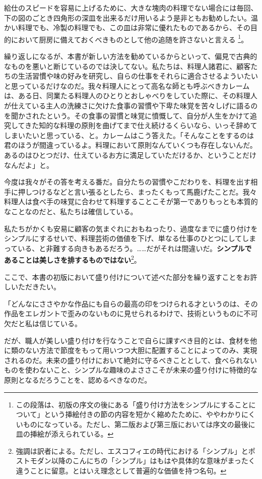 \begin{main}
給仕のスピードを容易に上げるために、大きな塊肉の料理でない場合には毎回、下の図のごとき四角形の深皿を出来るだけ用いるよう是非ともお勧めしたい。温かい料理でも、冷製の料理でも、この皿は非常に優れたものであるから、その目的において厨房に備えておくべきものとして他の追随を許さないと言える
\footnote{この段落は、初版の序文の後にある「盛り付け方法をシンプルにすることについて」という挿絵付きの節の内容を短かく縮めたために、ややわかりにくいものになっている。ただし、第二版および第三版においては序文の最後に皿の挿絵が添えられている。}。

繰り返しになるが、本書が新しい方法を勧めているからといって、偏見で古典的なものを悪いと断じているのでは決してない。私たちは、料理人諸君に、顧客たちの生活習慣や味の好みを研究し、自らの仕事をそれらに適合させるよういたいと思っているだけなのだ。我々料理人にとって高名な師とも呼ぶべきカレームは、ある日、同業たる料理人のひとりとおしゃべりをしていた際に、その料理人が仕えている主人の洗練さに欠けた食事の習慣や下卑た味覚を苦々しげに語るのを聞かされたという。その食事の習慣と味覚に憤慨して、自分が人生をかけて追究してきた知的な料理の原則を曲げてまで仕え続けるくらいなら、いっそ辞めてしまいたいと思っている、と。カレームはこう答えた。「そんなことをするのは君のほうが間違っているよ。料理において原則なんていくつも存在しないんだ。あるのはひとつだけ、仕えているお方に満足していただけるか、ということだけなんだよ」と。

今度は我々がその答を考える番だ。自分たちの習慣やこだわりを、料理を出す相手に押しつけるなどと言い張るとしたら、まったくもって馬鹿げたことだ。我々料理人は食べ手の味覚に合わせて料理することこそが第一でありもっとも本質的なことなのだと、私たちは確信している。

私たちがかくも安易に顧客の気まぐれにおもねったり、過度なまでに盛り付けをシンプルにするせいで、料理芸術の価値を下げ、単なる仕事のひとつにしてしまっている、と非難する向きもあるだろう。\ldots{}\ldots{}だがそれは間違いだ。\textbf{シンプルであることは美しさを排するものではない}\footnote{強調は訳者による。ただし、エスコフィエの時代における「シンプル」とポストモダン以降のこんにちの「シンプル」はもはや具体的な意味がまったく違うことに留意。とはいえ理念として普遍的な価値を持つ名句。}。

ここで、本書の初版において盛り付けについて述べた部分を繰り返すことをお許しいただきたい。

「どんなにささやかな作品にも自らの最高の印をつけられる才というのは、その作品をエレガントで歪みのないものに見せられるわけで、技術というものに不可欠だと私は信じている。

だが、職人が美しい盛り付けを行なうことで自らに課すべき目的とは、食材を他に類のない方法で節度をもって用いつつ大胆に配置することによってのみ、実現されるのだ。未来の盛り付けにおいて絶対に守るべきこととして、食べられないものを使わないこと、シンプルな趣味のよささこそが未来の盛り付けに特徴的な原則となるだろうことを、認めるべきなのだ。


\end{main}
